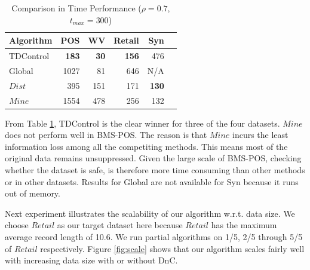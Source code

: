 \begin{table}[th]
\caption{Comparison in Time Performance ($\rho=0.7$, $t_{max}=300$)
\label{tab:timeresult}}
\centering
\begin{tabular}{|l|r|r|r|r|r|}
  \hline
  Algorithm & POS & WV & Retail  &Syn \\  \hline \hline
  TDControl & \bf{183} & \bf{30 }& \bf{156} &   476  \\  \hline
  Global & 1027 & 81 & 646 &   N/A  \\  \hline
  $Dist$ & 395 & 151 & 171 &\bf{130}\\ \hline
  $Mine$ & 1554 & 478& 256 & 132\\ \hline
  \end{tabular}
\end{table}

From Table \ref{tab:timeresult}, TDControl is the clear winner
for three of the four datasets. $Mine$ does not perform well in BMS-POS. The reason is that $Mine$ incurs the least information loss among all the
competiting methods. This means most of the original data remains
unsuppressed. Given the large scale of BMS-POS, checking whether the
dataset is safe, is therefore more time consuming than
other methods or in other datasets. Results for Global are not available for Syn because it runs out of memory.

Next experiment illustrates the scalability of our algorithm
w.r.t. data size. We choose $Retail$ as our target dataset here
because $Retail$ has the maximum average record length of 10.6.
We run partial algorithms on 1/5, 2/5 through 5/5 of $Retail$ respectively.
Figure \ref{fig:scale} shows that our algorithm scales fairly well
with increasing data size with or without DnC.

